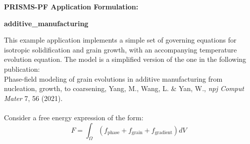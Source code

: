 \documentclass[10pt]{article}
\begin{document}
\def\Bomega{\mbox{\boldmath$\omega$}}
\def\Bvarepsilon{\mbox{\boldmath$\varepsilon$}}
\def\Bvartheta{\mbox{\boldmath$\vartheta$}}
\def\Bvarpi{\mbox{\boldmath$\varpi$}}
\def\Bvarrho{\mbox{\boldmath$\varrho$}}
\def\Bvarsigma{\mbox{\boldmath$\varsigma$}}
\def\Bvarphi{\mbox{\boldmath$\varphi$}}
\def\bone{\mathbf{1}}
\def\bzero{\mathbf{0}}
\def\bA{\mbox{\boldmath$ A$}}
\def\bB{\mbox{\boldmath$ B$}}
\def\bC{\mbox{\boldmath$ C$}}
\def\bD{\mbox{\boldmath$ D$}}
\def\bE{\mbox{\boldmath$ E$}}
\def\bF{\mbox{\boldmath$ F$}}
\def\bG{\mbox{\boldmath$ G$}}
\def\bH{\mbox{\boldmath$ H$}}
\def\bI{\mbox{\boldmath$ I$}}
\def\bJ{\mbox{\boldmath$ J$}}
\def\bK{\mbox{\boldmath$ K$}}
\def\bL{\mbox{\boldmath$ L$}}
\def\bM{\mbox{\boldmath$ M$}}
\def\bN{\mbox{\boldmath$ N$}}
\def\bO{\mbox{\boldmath$ O$}}
\def\bP{\mbox{\boldmath$ P$}}
\def\bQ{\mbox{\boldmath$ Q$}}
\def\bR{\mbox{\boldmath$ R$}}
\def\bS{\mbox{\boldmath$ S$}}
\def\bT{\mbox{\boldmath$ T$}}
\def\bU{\mbox{\boldmath$ U$}}
\def\bV{\mbox{\boldmath$ V$}}
\def\bW{\mbox{\boldmath$ W$}}
\def\bX{\mbox{\boldmath$ X$}}
\def\bY{\mbox{\boldmath$ Y$}}
\def\bZ{\mbox{\boldmath$ Z$}}
\def\ba{\mbox{\boldmath$ a$}}
\def\bb{\mbox{\boldmath$ b$}}
\def\bc{\mbox{\boldmath$ c$}}
\def\bd{\mbox{\boldmath$ d$}}
\def\be{\mbox{\boldmath$ e$}}
\def\bff{\mbox{\boldmath$ f$}}
\def\bg{\mbox{\boldmath$ g$}}
\def\bh{\mbox{\boldmath$ h$}}
\def\bi{\mbox{\boldmath$ i$}}
\def\bj{\mbox{\boldmath$ j$}}
\def\bk{\mbox{\boldmath$ k$}}
\def\bl{\mbox{\boldmath$ l$}}
\def\bm{\mbox{\boldmath$ m$}}
\def\bn{\mbox{\boldmath$ n$}}
\def\bo{\mbox{\boldmath$ o$}}
\def\bp{\mbox{\boldmath$ p$}}
\def\bq{\mbox{\boldmath$ q$}}
\def\br{\mbox{\boldmath$ r$}}
\def\bs{\mbox{\boldmath$ s$}}
\def\bt{\mbox{\boldmath$ t$}}
\def\bu{\mbox{\boldmath$ u$}}
\def\bv{\mbox{\boldmath$ v$}}
\def\bw{\mbox{\boldmath$ w$}}
\def\bx{\mbox{\boldmath$ x$}}
\def\by{\mbox{\boldmath$ y$}}
\def\bz{\mbox{\boldmath$ z$}}
\centerline{\Large{\bf PRISMS-PF Application Formulation:}}
\smallskip
\centerline{\Large{\bf additive\_manufacturing}}
\bigskip

This example application implements a simple set of governing equations for isotropic solidification and grain growth, with an accompanying temperature evolution equation. The model is a simplified version of the one in the following publication:\\
 Phase-field modeling of grain evolutions in additive manufacturing from nucleation, growth, to coarsening, Yang, M., Wang, L. \& Yan, W., \emph{npj Comput Mater} 7, 56 (2021).
\\
\\
Consider a free energy expression of the form:
\begin{equation}
F=\int_{\Omega}\left(f_{\mathrm{phase}}+f_{\mathrm{grain}}+f_{\mathrm{gradient}}\right)dV\label{eq:Free_energy_equation}
\end{equation}
\end{document}
